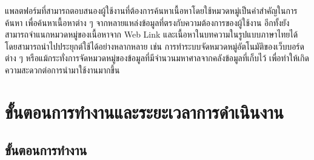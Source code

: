 \documentclass[12pt,oneside,openright,a4paper]{cpe-thai-project}
\begin{document}
\hspace{1cm}แพลตฟอร์มที่สามารถตอบสนองผู้ใช้งานที่ต้องการค้นหาเนื้อหาโดยใช้หมวดหมู่เป็นคำสำคัญในการค้นหา เพื่อค้นหาเนื้อหาต่าง ๆ จากหลายแหล่งข้อมูลที่ตรงกับความต้องการของผู้ใช้งาน 
อีกทั้งยังสามารถจำแนกหมวดหมู่ของเนื้อหาจาก Web Link และเนื้อหาในบทความในรูปแบบภาษาไทยได้ โดยสามารถนำไปประยุกต์ใช้ได้อย่างหลากหลาย เช่น 
การทำระบบจัดหมวดหมู่อัตโนมัติของเว็บบอร์ดต่าง ๆ หรือแม้กระทั่งการจัดหมวดหมู่ของข้อมูลที่มีจำนวนมหาศาลจากคลังข้อมูลที่เก็บไว้ เพื่อทำให้เกิดความสะดวกต่อการนำมาใช้งานมากขึ้น

\section{ขั้นตอนการทํางานและระยะเวลาการดําเนินงาน} 
\subsection{ขั้นตอนการทํางาน} 
\end{document}
